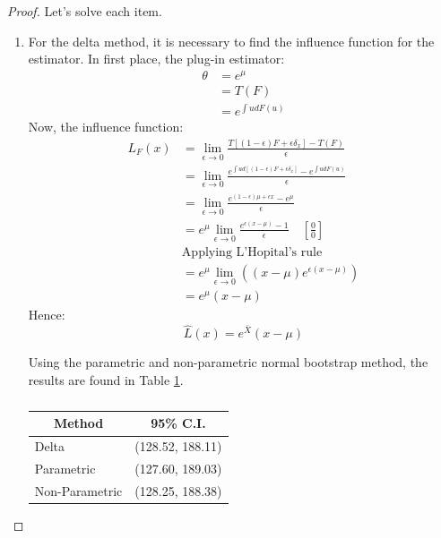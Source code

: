 \documentclass[11pt]{article}
\theoremstyle{definition}
\theoremstyle{remark}
\theoremstyle{remark}
\begin{document}
\begin{proof}
  Let's solve each item.
  \begin{enumerate}[label=\alph*)]
  \item For the delta method, it is necessary to find the influence
    function for the estimator. In first place, the plug-in
    estimator:
    \begin{align*}
      \theta &= e^\mu \\
             &= T(F) \\
             &= e^{\int u dF(u)}
    \end{align*}
    Now, the influence function:
    \begin{align*}
      L_F(x) &= \lim_{\epsilon \rightarrow 0} \frac{T\left[(1 - \epsilon)F +
               \epsilon \delta_x\right] - T(F)}{\epsilon} \\
      &= \lim_{\epsilon \rightarrow 0} \frac{e^{\int u d\left[(1 - \epsilon)F +
        \epsilon \delta_x\right]} - e^{\int u dF(u)}}{\epsilon} \\
             &= \lim_{\epsilon \rightarrow 0} \frac{e^{(1 - \epsilon)\mu + \epsilon x} - e^\mu}
               {\epsilon} \\
             &= e^\mu \lim_{\epsilon \rightarrow 0} \frac{e^{\epsilon(x - \mu)} - 1}{\epsilon}
             \quad \left[\frac{0}{0}\right]\\
             &\text{Applying L'Hopital's rule} \\
             &= e^\mu \lim_{\epsilon \rightarrow 0} \left((x - \mu) e^{\epsilon(x - \mu)}\right) \\
             &= e^\mu (x - \mu)
    \end{align*}
    Hence:
    \begin{equation*}
      \hat{L}(x) = e^{\bar{X}} (x - \mu)
    \end{equation*}

    Using the parametric and non-parametric normal bootstrap method,
    the results are found in Table \ref{tab:cis1}.
    \begin{table}[H]
      \centering
      \begin{tabular}{ll}
        \hline
        \multicolumn{1}{c}{\textbf{Method}} & \multicolumn{1}{c}{\textbf{95\% C.I.}} \\ \hline
        Delta                               & (128.52, 188.11)     \\
        Parametric                          & (127.60, 189.03)     \\
        Non-Parametric                      & (128.25, 188.38)
      \end{tabular}
      \caption{}
      \label{tab:cis1}
    \end{table}


\end{enumerate}
\end{proof}
\end{document}
